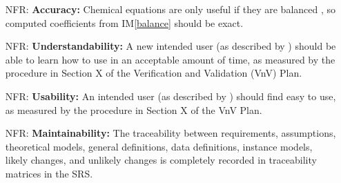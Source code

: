 \documentclass[12pt]{article}
\newcommand{\iref}[1]{IM\ref{#1}}
\newcounter{nfrnum} %
\begin{document}
\begin{itemize}

  \item[NFR\refstepcounter{nfrnum}\thenfrnum \label{NFR_accuracy}:]
    \textbf{Accuracy:} Chemical equations are only useful if they are balanced
    \cite{lund_introduction_2023}, so computed coefficients from \iref{balance}
    should be exact.



  \item[NFR\refstepcounter{nfrnum}\thenfrnum \label{NFR_understandability}:]
    \textbf{Understandability:} A new intended user (as described by
    ) should be able to learn how to use \progname{} in an
    acceptable amount of time, as measured by the procedure in Section X of
    the Verification and Validation (VnV) Plan.

  \item[NFR\refstepcounter{nfrnum}\thenfrnum \label{NFR_usability}:]
    \textbf{Usability:} An intended user (as described by )
    should find \progname{} easy to use, as measured by the procedure in Section X
    of the VnV Plan.

  \item[NFR\refstepcounter{nfrnum}\thenfrnum \label{NFR_maintainability}:]
    \textbf{Maintainability:} The traceability between requirements, assumptions,
    theoretical models, general definitions, data definitions, instance models,
    likely changes, and unlikely changes is completely recorded in
    traceability matrices in the SRS.


\end{itemize}
\end{document}
